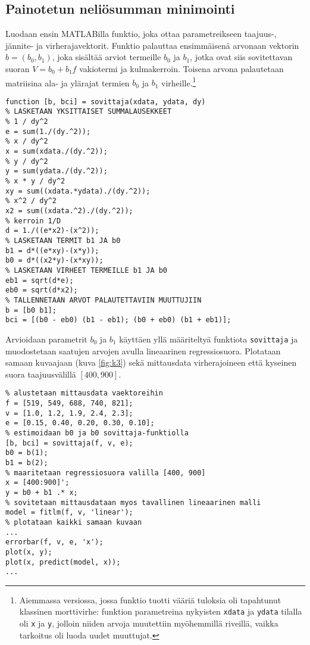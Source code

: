 \documentclass[a4paper,11pt]{article}
\begin{document}
{\subsection{Painotetun neliösumman minimointi}

Luodaan ensin MATLABilla funktio, joka ottaa parametreikseen taajuus-,\\ jännite- ja virherajavektorit. Funktio palauttaa ensimmäisenä arvonaan vektorin $b = (b_0, b_1)$, joka sisältää arviot termeille $b_0$ ja $b_1$, jotka ovat siis sovitettavan suoran $V = b_0 + b_1f$ vakiotermi ja kulmakerroin. Toisena arvona palautetaan matriisina ala- ja ylärajat termien $b_0$ ja $b_1$ virheille.\footnote{Aiemmassa versiossa, jossa funktio tuotti vääriä tuloksia oli tapahtunut klassinen morttivirhe: funktion parametreina nykyisten \texttt{xdata} ja \texttt{ydata} tilalla oli \texttt{x} ja \texttt{y}, jolloin niiden arvoja muutettiin myöhemmillä riveillä, vaikka tarkoitus oli luoda uudet muuttujat.}

\begin{lstlisting}
function [b, bci] = sovittaja(xdata, ydata, dy)
% LASKETAAN YKSITTAISET SUMMALAUSEKKEET
% 1 / dy^2
e = sum(1./(dy.^2));
% x / dy^2
x = sum(xdata./(dy.^2));
% y / dy^2
y = sum(ydata./(dy.^2));
% x * y / dy^2
xy = sum((xdata.*ydata)./(dy.^2));
% x^2 / dy^2
x2 = sum((xdata.^2)./(dy.^2));
% kerroin 1/D
d = 1./((e*x2)-(x^2));
% LASKETAAN TERMIT b1 JA b0
b1 = d*((e*xy)-(x*y));
b0 = d*((x2*y)-(x*xy));
% LASKETAAN VIRHEET TERMEILLE b1 JA b0
eb1 = sqrt(d*e);
eb0 = sqrt(d*x2);
% TALLENNETAAN ARVOT PALAUTETTAVIIN MUUTTUJIIN
b = [b0 b1];
bci = [(b0 - eb0) (b1 - eb1); (b0 + eb0) (b1 + eb1)];
\end{lstlisting}

Arvioidaan parametrit $b_0$ ja $b_1$ käyttäen yllä määriteltyä funktiota \texttt{sovittaja} ja muodostetaan saatujen arvojen avulla lineaarinen regressiosuora. Plotataan samaan kuvaajaan (kuva \ref{fig:k3}) sekä mittausdata virherajoineen että kyseinen suora taajuusvälillä $[400, 900]$.

\begin{lstlisting}
% alustetaan mittausdata vaektoreihin
f = [519, 549, 688, 740, 821];
v = [1.0, 1.2, 1.9, 2.4, 2.3];
e = [0.15, 0.40, 0.20, 0.30, 0.10];
% estimoidaan b0 ja b0 sovittaja-funktiolla
[b, bci] = sovittaja(f, v, e);
b0 = b(1);
b1 = b(2);
% maaritetaan regressiosuora valilla [400, 900]
x = [400:900]';
y = b0 + b1 .* x;
% sovitetaan mittausdataan myos tavallinen lineaarinen malli
model = fitlm(f, v, 'linear');
% plotataan kaikki samaan kuvaan
...
errorbar(f, v, e, 'x');
plot(x, y);
plot(x, predict(model, x));
...
\end{lstlisting}

}
\end{document}

